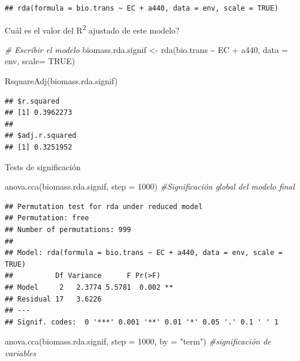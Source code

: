 \documentclass[
]{book}
\newenvironment{Shaded}{\begin{snugshade}}{\end{snugshade}}
\newcommand{\AttributeTok}[1]{\textcolor[rgb]{0.77,0.63,0.00}{#1}}
\newcommand{\CommentTok}[1]{\textcolor[rgb]{0.56,0.35,0.01}{\textit{#1}}}
\newcommand{\ConstantTok}[1]{\textcolor[rgb]{0.00,0.00,0.00}{#1}}
\newcommand{\DecValTok}[1]{\textcolor[rgb]{0.00,0.00,0.81}{#1}}
\newcommand{\FunctionTok}[1]{\textcolor[rgb]{0.00,0.00,0.00}{#1}}
\newcommand{\NormalTok}[1]{#1}
\newcommand{\OtherTok}[1]{\textcolor[rgb]{0.56,0.35,0.01}{#1}}
\newcommand{\SpecialCharTok}[1]{\textcolor[rgb]{0.00,0.00,0.00}{#1}}
\newcommand{\StringTok}[1]{\textcolor[rgb]{0.31,0.60,0.02}{#1}}
\begin{document}
\begin{verbatim}
## rda(formula = bio.trans ~ EC + a440, data = env, scale = TRUE)
\end{verbatim}

Cuál es el valor del R\textsuperscript{2} ajustado de este modelo?

\begin{Shaded}
\begin{Highlighting}[]
\CommentTok{\# Escribir el modelo}
\NormalTok{biomass.rda.signif }\OtherTok{\textless{}{-}} \FunctionTok{rda}\NormalTok{(bio.trans }\SpecialCharTok{\textasciitilde{}}\NormalTok{ EC }\SpecialCharTok{+}\NormalTok{ a440, }\AttributeTok{data =}\NormalTok{ env, }\AttributeTok{scale=} \ConstantTok{TRUE}\NormalTok{)}


\FunctionTok{RsquareAdj}\NormalTok{(biomass.rda.signif)}
\end{Highlighting}
\end{Shaded}

\begin{verbatim}
## $r.squared
## [1] 0.3962273
## 
## $adj.r.squared
## [1] 0.3251952
\end{verbatim}

Tests de significación

\begin{Shaded}
\begin{Highlighting}[]
\FunctionTok{anova.cca}\NormalTok{(biomass.rda.signif, }\AttributeTok{step =} \DecValTok{1000}\NormalTok{) }\CommentTok{\#Significación global del modelo final}
\end{Highlighting}
\end{Shaded}

\begin{verbatim}
## Permutation test for rda under reduced model
## Permutation: free
## Number of permutations: 999
## 
## Model: rda(formula = bio.trans ~ EC + a440, data = env, scale = TRUE)
##          Df Variance      F Pr(>F)   
## Model     2   2.3774 5.5781  0.002 **
## Residual 17   3.6226                 
## ---
## Signif. codes:  0 '***' 0.001 '**' 0.01 '*' 0.05 '.' 0.1 ' ' 1
\end{verbatim}

\begin{Shaded}
\begin{Highlighting}[]
\FunctionTok{anova.cca}\NormalTok{(biomass.rda.signif, }\AttributeTok{step =} \DecValTok{1000}\NormalTok{, }\AttributeTok{by =} \StringTok{"term"}\NormalTok{) }\CommentTok{\#significación de variables }
\end{Highlighting}
\end{Shaded}
\end{document}
